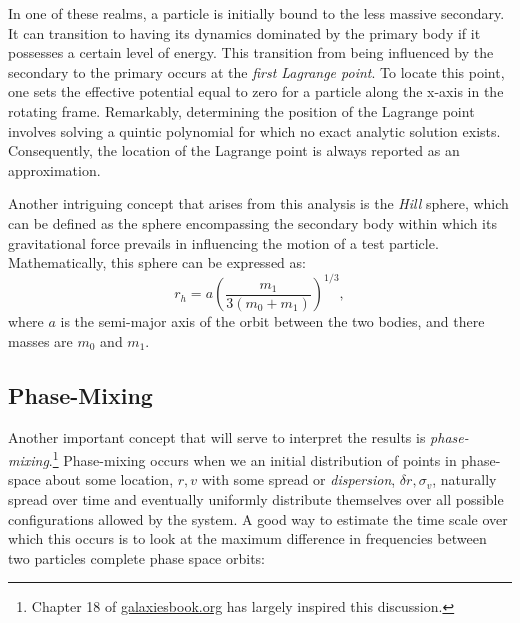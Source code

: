 In one of these realms, a particle is initially bound to the less massive secondary. It can transition to having its dynamics dominated by the primary body if it possesses a certain level of energy. This transition from being influenced by the secondary to the primary occurs at the \textit{first Lagrange point}. To locate this point, one sets the effective potential equal to zero for a particle along the x-axis in the rotating frame. Remarkably, determining the position of the Lagrange point involves solving a quintic polynomial for which no exact analytic solution exists. Consequently, the location of the Lagrange point is always reported as an approximation.


Another intriguing concept that arises from this analysis is the \textit{Hill} sphere, which can be defined as the sphere encompassing the secondary body within which its gravitational force prevails in influencing the motion of a test particle. Mathematically, this sphere can be expressed as:
\begin{equation}
    r_h = a\left(\frac{m_1}{3\left(m_0+m_1\right)}\right)^{1/3},
\end{equation}
where $a$ is the semi-major axis of the orbit between the two bodies, and there masses are $m_0$ and $m_1$.

\subsection{Phase-Mixing}

Another important concept that will serve to interpret the results is \textit{phase-mixing}.\footnote{Chapter 18 of \url{galaxiesbook.org} has largely inspired this discussion.} Phase-mixing occurs when we an initial distribution of points in phase-space about some location, $r,v$ with some spread or \textit{dispersion}, $\delta r, \sigma_{v}$, naturally spread over time and eventually uniformly distribute themselves over all possible configurations allowed by the system. A good way to estimate the time scale over which this occurs is to look at the maximum difference in frequencies between two particles complete phase space orbits: 

